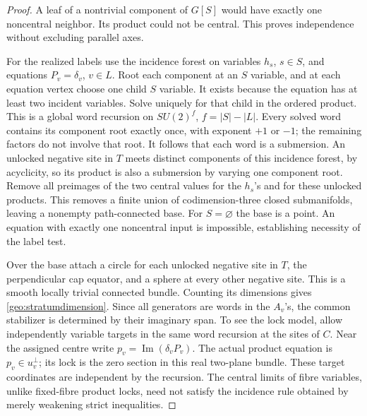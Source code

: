 \begin{proof}
A leaf of a nontrivial component of \(G[S]\) would have exactly one noncentral neighbor. Its product could not be central. This proves independence without excluding parallel axes.

For the realized labels use the incidence forest on variables \(h_s\), \(s\in S\), and equations \(P_v=\delta_v\), \(v\in L\). Root each component at an \(S\) variable, and at each equation vertex choose one child \(S\) variable. It exists because the equation has at least two incident variables. Solve uniquely for that child in the ordered product. This is a global word recursion on \(SU(2)^f\), \(f=|S|-|L|\). Every solved word contains its component root exactly once, with exponent \(+1\) or \(-1\); the remaining factors do not involve that root. It follows that each word is a submersion. An unlocked negative site in \(T\) meets distinct components of this incidence forest, by acyclicity, so its product is also a submersion by varying one component root. Remove all preimages of the two central values for the \(h_s\)'s and for these unlocked products. This removes a finite union of codimension-three closed submanifolds, leaving a nonempty path-connected base. For \(S=\varnothing\) the base is a point. An equation with exactly one noncentral input is impossible, establishing necessity of the label test.

Over the base attach a circle for each unlocked negative site in \(T\), the perpendicular cap equator, and a sphere at every other negative site. This is a smooth locally trivial connected bundle. Counting its dimensions gives \eqref{geo:stratumdimension}. Since all generators are words in the \(A_v\)'s, the common stabilizer is determined by their imaginary span. To see the lock model, allow independently variable targets in the same word recursion at the sites of \(C\). Near the assigned centre write \(p_v=\operatorname{Im}(\delta_vP_v)\). The actual product equation is \(p_v\in u_v^\perp\); its lock is the zero section in this real two-plane bundle. These target coordinates are independent by the recursion. The central limits of fibre variables, unlike fixed-fibre product locks, need not satisfy the incidence rule obtained by merely weakening strict inequalities.
\end{proof}

